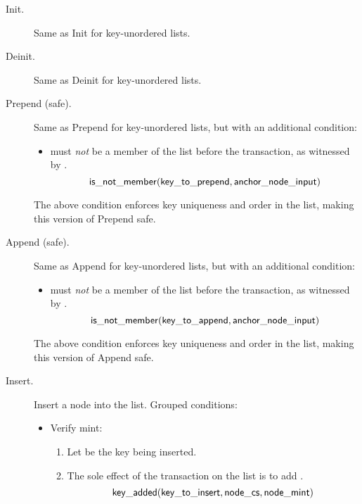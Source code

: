 \documentclass[../midgard.tex]{subfiles}
\begin{document}
\begin{description}
    \item[Init.] Same as Init for key-unordered lists.
        \initSpendingValidatorWarning
    \item[Deinit.] Same as Deinit for key-unordered lists.
    \item[Prepend (safe).] Same as Prepend for key-unordered lists, but with an additional condition:
        \begin{itemize}
            \item {} must \emph{not} be a member of the list before the transaction, as witnessed by .
                \begin{equation*}
                    \mathsf{is\_not\_member} (\mathsf{key\_to\_prepend}, \mathsf{anchor\_node\_input})
                \end{equation*}
        \end{itemize}

    The above condition enforces key uniqueness and order in the list, making this version of Prepend safe.
    
    \item[Append (safe).] Same as Append for key-unordered lists, but with an additional condition:
        \begin{itemize}
            \item {} must \emph{not} be a member of the list before the transaction, as witnessed by .
                \begin{equation*}
                    \mathsf{is\_not\_member} (\mathsf{key\_to\_append}, \mathsf{anchor\_node\_input})
                \end{equation*}
        \end{itemize}

    The above condition enforces key uniqueness and order in the list, making this version of Append safe.
    
    \item[Insert.] Insert a node into the list. Grouped conditions:
        \begin{itemize}
            \item Verify mint:
            \begin{enumerate}
                \item Let  be the key being inserted.
                \item The sole effect of the transaction on the list is to add .
                    \begin{equation*}
                        \mathsf{key\_added}(\mathsf{key\_to\_insert}, \mathsf{node\_cs}, \mathsf{node\_mint})
                    \end{equation*}
            \end{enumerate}
            

\end{itemize}
\end{description}
\end{document}
